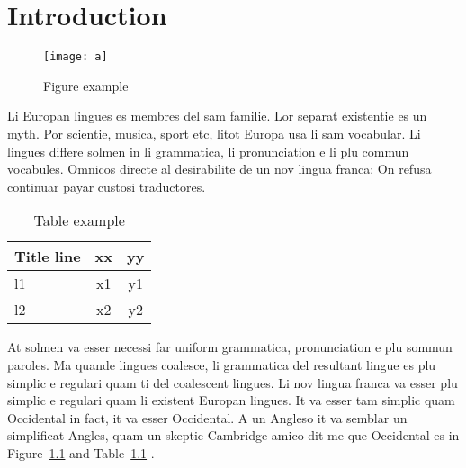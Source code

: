 \chapter{Introduction}

\begin{figure}[H]
   \centering
   \texttt{[image: a]}
   \caption{Figure example}
   \label{fig:example}
\end{figure}

Li Europan lingues es membres del sam familie. Lor separat existentie es un myth. Por scientie, musica, sport etc, litot Europa usa li sam vocabular. Li lingues differe solmen in li grammatica, li pronunciation e li plu commun vocabules. Omnicos directe al desirabilite de un nov lingua franca: On refusa continuar payar custosi traductores.

\begin{table}[t]
\caption{Table example }
\begin{center}
\begin{tabular}{lcc}
Title line & xx & yy \\
\hline
l1 &x1  & y1 \\
l2 &x2  & y2 \\
\hline
\end{tabular}
\end{center}
\label{tab:example}
\end{table}

At solmen va esser necessi far uniform grammatica, pronunciation e plu sommun paroles. Ma quande lingues coalesce, li grammatica del resultant lingue es plu simplic e regulari quam ti del coalescent lingues. Li nov lingua franca va esser plu simplic e regulari quam li existent Europan lingues. It va esser tam simplic quam Occidental in fact, it va esser Occidental. A un Angleso it va semblar un simplificat Angles, quam un skeptic Cambridge amico dit me que Occidental es in Figure~\ref{fig:example} and Table~\ref{tab:example} \cite{ex}.

